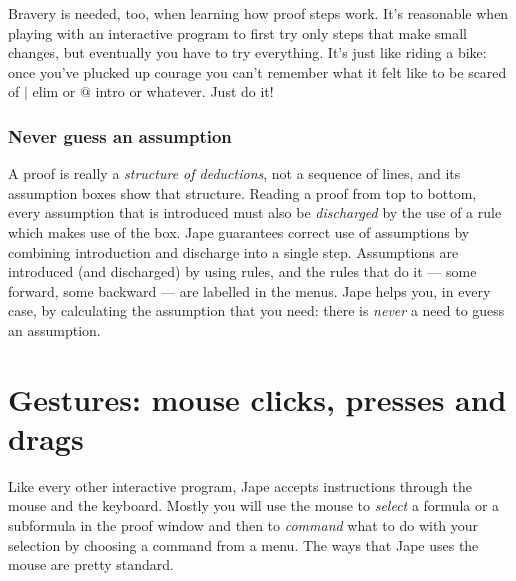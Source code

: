 \documentclass[11pt]{book}
\begin{document}
Bravery is needed, too, when learning how proof steps work. It's reasonable when playing with an interactive program to first try only steps that make small changes, but eventually you have to try everything. It's just like riding a bike: once you've plucked up courage you can't remember what it felt like to be scared of $|$ elim or $@$ intro or whatever. Just do it!  

\subsection{Never guess an assumption}

A proof is really a \emph{structure of deductions}, not a sequence of lines, and its assumption boxes show that structure. Reading a proof from top to bottom, every assumption that is introduced must also be \emph{discharged} by the use of a rule which makes use of the box. Jape guarantees correct use of assumptions by combining introduction and discharge into a single step. Assumptions are introduced (and discharged) by using rules, and the rules that do it --- some forward, some backward --- are labelled in the menus. Jape helps you, in every case, by calculating the assumption that you need: there is \emph{never} a need to guess an assumption.

\chapter{Gestures: mouse clicks, presses and drags}
\label{chap:gestures}

Like every other interactive program, Jape accepts instructions through the mouse and the keyboard. Mostly you will use the mouse to \emph{select} a formula or a subformula in the proof window and then to \emph{command} what to do with your selection by choosing a command from a menu. The ways that Jape uses the mouse are pretty standard.
\end{document}
